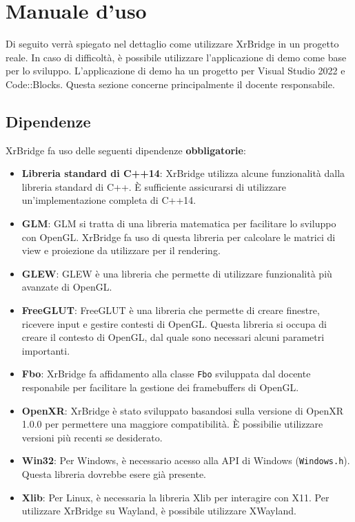 \documentclass[twoside]{supsistudent}
\begin{document}
\section{Manuale d'uso}

Di seguito verrà spiegato nel dettaglio come utilizzare XrBridge in un progetto reale. In caso di difficoltà, è possibile utilizzare l'applicazione di demo come base per lo sviluppo. L'applicazione di demo ha un progetto per Visual Studio 2022 e Code::Blocks. Questa sezione concerne principalmente il docente responsabile.

\subsection{Dipendenze}

XrBridge fa uso delle seguenti dipendenze \textbf{obbligatorie}:

\begin{itemize}
  \item \textbf{Libreria standard di C++14}: XrBridge utilizza alcune funzionalità dalla libreria standard di C++. È sufficiente assicurarsi di utilizzare un'implementazione completa di C++14.
  \item \textbf{GLM}: GLM si tratta di una libreria matematica per facilitare lo sviluppo con OpenGL. XrBridge fa uso di questa libreria per calcolare le matrici di view e proiezione da utilizzare per il rendering.
  \item \textbf{GLEW}: GLEW è una libreria che permette di utilizzare funzionalità più avanzate di OpenGL.
  \item \textbf{FreeGLUT}: FreeGLUT è una libreria che permette di creare finestre, ricevere input e gestire contesti di OpenGL. Questa libreria si occupa di creare il contesto di OpenGL, dal quale sono necessari alcuni parametri importanti.
  \item \textbf{Fbo}: XrBridge fa affidamento alla classe \texttt{Fbo} sviluppata dal docente responabile per facilitare la gestione dei framebuffers di OpenGL.
  \item \textbf{OpenXR}: XrBridge è stato sviluppato basandosi sulla versione di OpenXR 1.0.0 per permettere una maggiore compatibilità. È possibilie utilizzare versioni più recenti se desiderato.
  \item \textbf{Win32}: Per Windows, è necessario acesso alla API di Windows (\texttt{Windows.h}). Questa libreria dovrebbe esere già presente.
  \item \textbf{Xlib}: Per Linux, è necessaria la libreria Xlib per interagire con X11. Per utilizzare XrBridge su Wayland, è possibile utilizzare XWayland.
\end{itemize}
\end{document}
